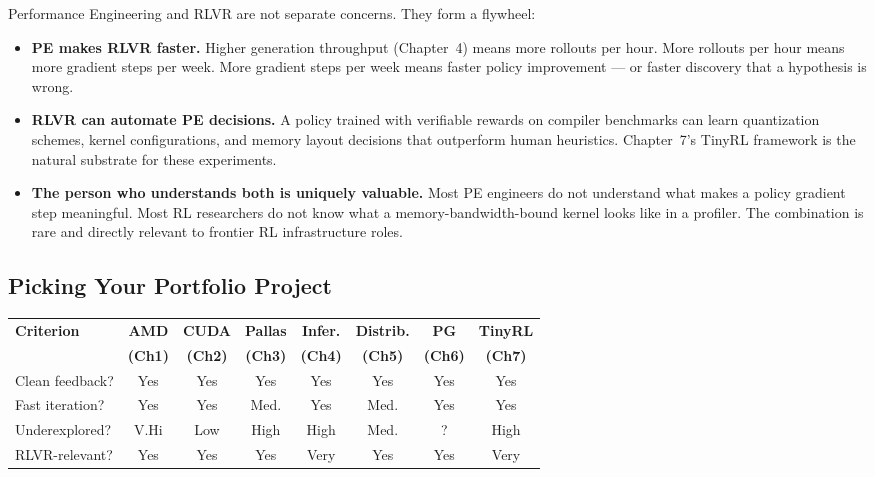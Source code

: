 Performance Engineering and RLVR are not separate concerns. They form a flywheel:

\begin{itemize}
  \item \textbf{PE makes RLVR faster.} Higher generation throughput (Chapter~4) means more rollouts per hour. More rollouts per hour means more gradient steps per week. More gradient steps per week means faster policy improvement --- or faster discovery that a hypothesis is wrong.
  \item \textbf{RLVR can automate PE decisions.} A policy trained with verifiable rewards on compiler benchmarks can learn quantization schemes, kernel configurations, and memory layout decisions that outperform human heuristics. Chapter~7's TinyRL framework is the natural substrate for these experiments.
  \item \textbf{The person who understands both is uniquely valuable.} Most PE engineers do not understand what makes a policy gradient step meaningful. Most RL researchers do not know what a memory-bandwidth-bound kernel looks like in a profiler. The combination is rare and directly relevant to frontier RL infrastructure roles.
\end{itemize}

\subsection{Picking Your Portfolio Project}

\begin{table}[h]
\centering
\footnotesize
\setlength{\tabcolsep}{3pt}
\begin{tabular}{@{}lccccccc@{}}
\toprule
\textbf{Criterion} & \textbf{AMD} & \textbf{CUDA} & \textbf{Pallas} & \textbf{Infer.} & \textbf{Distrib.} & \textbf{PG} & \textbf{TinyRL} \\
 & \textbf{(Ch1)} & \textbf{(Ch2)} & \textbf{(Ch3)} & \textbf{(Ch4)} & \textbf{(Ch5)} & \textbf{(Ch6)} & \textbf{(Ch7)} \\
\midrule
Clean feedback?   & Yes  & Yes  & Yes    & Yes  & Yes    & Yes     & Yes  \\
Fast iteration?   & Yes  & Yes  & Med.   & Yes  & Med.   & Yes     & Yes  \\
Underexplored?    & V.Hi & Low  & High   & High & Med.   & ?       & High \\
RLVR-relevant?    & Yes  & Yes  & Yes    & Very & Yes    & Yes     & Very \\
\bottomrule
\end{tabular}
\end{table}

